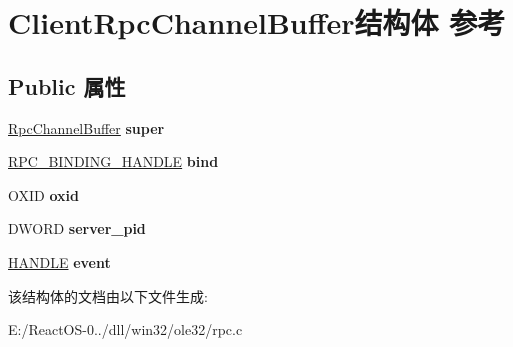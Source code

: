 \hypertarget{struct_client_rpc_channel_buffer}{}\section{Client\+Rpc\+Channel\+Buffer结构体 参考}
\label{struct_client_rpc_channel_buffer}
\subsection*{Public 属性}
\begin{DoxyCompactItemize}
\item 
\mbox{\label{struct_client_rpc_channel_buffer_a81b0c0bf1671f20cd63924296a056c9e}} 
\hyperlink{struct_rpc_channel_buffer}{Rpc\+Channel\+Buffer} {\bfseries super}
\item 
\mbox{\label{struct_client_rpc_channel_buffer_a5e94eb78e91d4d8d384c0b1ad9ac1637}} 
\hyperlink{interfacevoid}{R\+P\+C\+\_\+\+B\+I\+N\+D\+I\+N\+G\+\_\+\+H\+A\+N\+D\+LE} {\bfseries bind}
\item 
\mbox{\label{struct_client_rpc_channel_buffer_abfcf7ac9bbff7ba31d1a1313578253e3}} 
O\+X\+ID {\bfseries oxid}
\item 
\mbox{\label{struct_client_rpc_channel_buffer_ae8760b1628ddf4f0136f1ee0c2d9567c}} 
D\+W\+O\+RD {\bfseries server\+\_\+pid}
\item 
\mbox{\label{struct_client_rpc_channel_buffer_abce05c3a90d57c3c65dd34bd359a580a}} 
\hyperlink{interfacevoid}{H\+A\+N\+D\+LE} {\bfseries event}
\end{DoxyCompactItemize}


该结构体的文档由以下文件生成\+:\begin{DoxyCompactItemize}
\item 
E\+:/\+React\+O\+S-\/0../dll/win32/ole32/rpc.\+c\end{DoxyCompactItemize}
